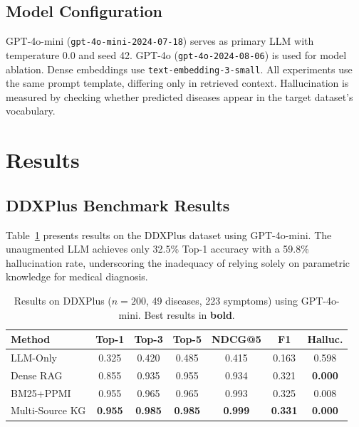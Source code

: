 \documentclass[preprint,12pt]{elsarticle}
\begin{document}
\subsection{Model Configuration}

GPT-4o-mini (\texttt{gpt-4o-mini-2024-07-18}) serves as primary LLM with temperature 0.0 and seed 42. GPT-4o (\texttt{gpt-4o-2024-08-06}) is used for model ablation. Dense embeddings use \texttt{text-embedding-3-small}. All experiments use the same prompt template, differing only in retrieved context. Hallucination is measured by checking whether predicted diseases appear in the target dataset's vocabulary.

\section{Results}
\label{sec:results}

\subsection{DDXPlus Benchmark Results}

Table~\ref{tab:ddxplus} presents results on the DDXPlus dataset using GPT-4o-mini. The unaugmented LLM achieves only 32.5\% Top-1 accuracy with a 59.8\% hallucination rate, underscoring the inadequacy of relying solely on parametric knowledge for medical diagnosis.

\begin{table}[t]
\centering
\caption{Results on DDXPlus ($n{=}200$, 49 diseases, 223 symptoms) using GPT-4o-mini. Best results in \textbf{bold}.}
\label{tab:ddxplus}
\begin{tabular}{lcccccc}
\toprule
\textbf{Method} & \textbf{Top-1} & \textbf{Top-3} & \textbf{Top-5} & \textbf{NDCG@5} & \textbf{F1} & \textbf{Halluc.} \\
\midrule
LLM-Only       & 0.325 & 0.420 & 0.485 & 0.415 & 0.163 & 0.598 \\
Dense RAG       & 0.855 & 0.935 & 0.955 & 0.934 & 0.321 & \textbf{0.000} \\
BM25+PPMI       & 0.955 & 0.965 & 0.965 & 0.993 & 0.325 & 0.008 \\
Multi-Source KG & \textbf{0.955} & \textbf{0.985} & \textbf{0.985} & \textbf{0.999} & \textbf{0.331} & \textbf{0.000} \\
\bottomrule
\end{tabular}
\end{table}
\end{document}
